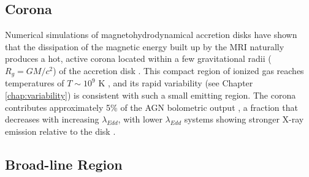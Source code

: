 \subsection{Corona}
\label{ssec:Corona}

Numerical simulations of magnetohydrodynamical accretion disks have shown that the dissipation of the magnetic energy built up by the MRI naturally produces a hot, active corona located within a few gravitational radii ($R_g = G M/c^2$) of the accretion disk \parencites{Balbus1998TurbulenceAccretionD}{Miller2000MagnetoCorona}{Fabian2009Corona}. This compact region of ionized gas reaches temperatures of $T \sim 10^9$ K \parencite{Kara2025SMBHXRayReview}, and its rapid variability (see Chapter \ref{chap:variability}) is consistent with such a small emitting region. The corona contributes approximately 5\% of the AGN bolometric output \parencite{Ricci2026unificationmodelsactivegalactic}, a fraction that decreases with increasing $\lambda_{Edd}$, with lower $\lambda_{Edd}$ systems showing stronger X-ray emission relative to the disk \parencite{Padovani2017whatisaname}.


\subsection{Broad-line Region}
\label{ssec:BLR}

